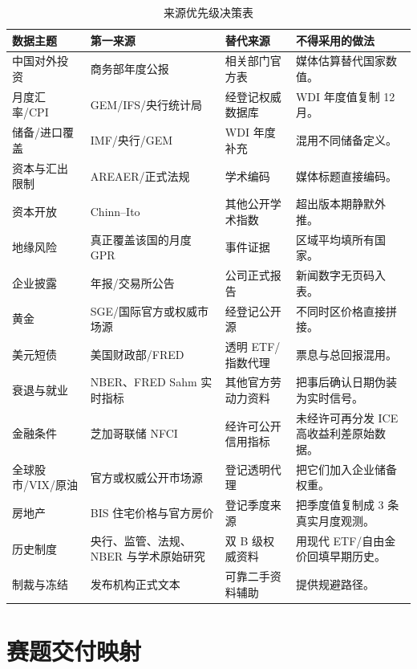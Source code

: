 \documentclass[UTF8,fontset=windows,12pt,openany]{ctexbook}
\begin{document}
\begin{longtable}{p{3.5cm}p{3.3cm}p{3.1cm}p{3.5cm}}
\caption{来源优先级决策表}\label{tab:source-priority}\\
\toprule
\textbf{数据主题} & \textbf{第一来源} & \textbf{替代来源} & \textbf{不得采用的做法}\\
\midrule
中国对外投资 & 商务部年度公报 & 相关部门官方表 & 媒体估算替代国家数值。\\
月度汇率/CPI & GEM/IFS/央行统计局 & 经登记权威数据库 & WDI 年度值复制 12 月。\\
储备/进口覆盖 & IMF/央行/GEM & WDI 年度补充 & 混用不同储备定义。\\
资本与汇出限制 & AREAER/正式法规 & 学术编码 & 媒体标题直接编码。\\
资本开放 & Chinn--Ito & 其他公开学术指数 & 超出版本期静默外推。\\
地缘风险 & 真正覆盖该国的月度 GPR & 事件证据 & 区域平均填所有国家。\\
企业披露 & 年报/交易所公告 & 公司正式报告 & 新闻数字无页码入表。\\
黄金 & SGE/国际官方或权威市场源 & 经登记公开源 & 不同时区价格直接拼接。\\
美元短债 & 美国财政部/FRED & 透明 ETF/指数代理 & 票息与总回报混用。\\
衰退与就业 & NBER、FRED Sahm 实时指标 & 其他官方劳动力资料 & 把事后确认日期伪装为实时信号。\\
金融条件 & 芝加哥联储 NFCI & 经许可公开信用指标 & 未经许可再分发 ICE 高收益利差原始数据。\\
全球股市/VIX/原油 & 官方或权威公开市场源 & 登记透明代理 & 把它们加入企业储备权重。\\
房地产 & BIS 住宅价格与官方房价 & 登记季度来源 & 把季度值复制成 3 条真实月度观测。\\
历史制度 & 央行、监管、法规、NBER 与学术原始研究 & 双 B 级权威资料 & 用现代 ETF/自由金价回填早期历史。\\
制裁与冻结 & 发布机构正式文本 & 可靠二手资料辅助 & 提供规避路径。\\
\bottomrule
\end{longtable}

\chapter{赛题交付映射}
\end{document}
